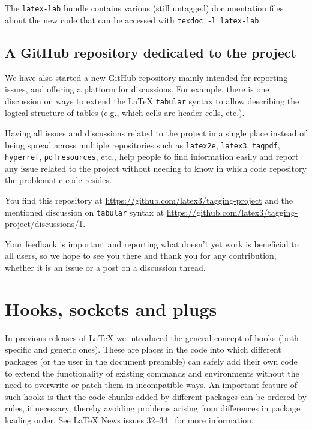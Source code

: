 \documentclass{ltnews}
\begin{document}
The \texttt{latex-lab} bundle contains various 
(still untagged) documentation files about the new code that can
be accessed with \verb|texdoc -l latex-lab|.

\subsection{A GitHub repository dedicated to the project}

We have also started a new GitHub repository mainly intended for
reporting issues, and offering a platform for discussions. For
example, there is one discussion on ways to extend the \LaTeX{} \texttt{tabular}
syntax to allow describing the logical structure of tables (e.g.,
which cells are header cells, etc.).

Having all issues and discussions related to the project in a single
place instead of being spread across multiple repositories such as
\texttt{latex2e}, \texttt{latex3}, \texttt{tagpdf}, \texttt{hyperref},
\texttt{pdfresources}, etc., help people to find information easily
and report any issue related to the project without needing to know in which
code repository the problematic code resides.

You find this repository at
\url{https://github.com/latex3/tagging-project} and the mentioned
discussion on \texttt{tabular} syntax at
\url{https://github.com/latex3/tagging-project/discussions/1}.

Your feedback is important and reporting what doesn't yet work is
beneficial to all users, so we hope to see you there and thank you for
any contribution, whether it is an issue or a post on a discussion
thread.


\section{Hooks, sockets and plugs}

In previous releases of \LaTeX{} we introduced the general concept of
hooks (both specific and generic ones). These are places in the
code into which different packages (or the user in the document
preamble) can safely add their own code to extend the functionality of
existing commands and environments without the need to overwrite or
patch them in incompatible ways. An important feature of such hooks is
that the code chunks added by different packages can be ordered by
rules, if necessary, thereby avoiding problems arising from
differences in package loading order. See \LaTeX{} News issues
32--34~\cite{38:ltnews} for more information.
\end{document}
